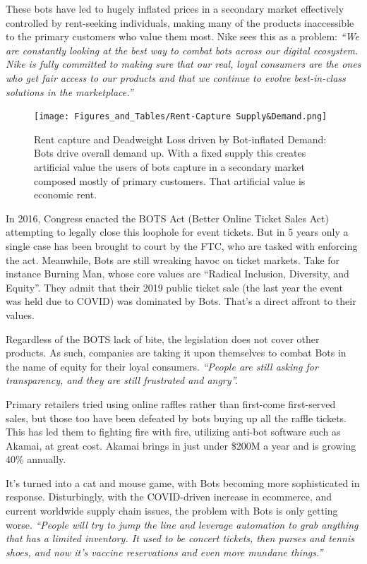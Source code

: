 \documentclass[runningheads]{llncs}
\begin{document}
These bots have led to hugely inflated prices in a secondary market effectively controlled by rent-seeking individuals, making many of the products inaccessible to the primary customers who value them most. Nike sees this as a problem: \emph{“We are constantly looking at the best way to combat bots across our digital ecosystem. Nike is fully committed to making sure that our real, loyal consumers are the ones who get fair access to our products and that we continue to evolve best-in-class solutions in the marketplace.”}\cite{3} 

\begin{figure}[H]
\centering
\texttt{[image: Figures\_and\_Tables/Rent-Capture Supply\&Demand.png]}
\caption{Rent capture and Deadweight Loss driven by Bot-inflated Demand: Bots drive overall demand up.  With a fixed supply this creates artificial value the users of bots capture in a secondary market composed mostly of primary customers.  That artificial value is economic rent.}
\end{figure}

In 2016, Congress enacted the BOTS Act (Better Online Ticket Sales Act) attempting to legally close this loophole for event tickets.\cite{10}   But in 5 years only a single case has been brought to court by the FTC, who are tasked with enforcing the act.\cite{11}   Meanwhile, Bots are still wreaking havoc on ticket markets.  Take for instance Burning Man, whose core values are “Radical Inclusion, Diversity, and Equity”.  They admit that their 2019 public ticket sale (the last year the event was held due to COVID) was dominated by Bots.\cite{12}   That’s a direct affront to their values.

Regardless of the BOTS lack of bite, the legislation does not cover other products.  As such, companies are taking it upon themselves to combat Bots in the name of equity for their loyal consumers.  \emph{“People are still asking for transparency, and they are still frustrated and angry”.}\cite{3}

Primary retailers tried using online raffles rather than first-come first-served sales, but those too have been defeated by bots buying up all the raffle tickets.  This has led them to fighting fire with fire, utilizing anti-bot software such as Akamai, at great cost.  Akamai brings in just under \$200M a year and is growing 40\% annually.\cite{3}

It’s turned into a cat and mouse game, with Bots becoming more sophisticated in response.  Disturbingly, with the COVID-driven increase in ecommerce, and current worldwide supply chain issues, the problem with Bots is only getting worse. \emph{“People will try to jump the line and leverage automation to grab anything that has a limited inventory.  It used to be concert tickets, then purses and tennis shoes, and now it’s vaccine reservations and even more mundane things.”}\cite{3}
\end{document}
